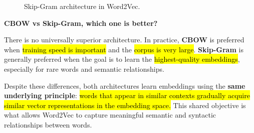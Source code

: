 \begin{figure}[!htp]
    \caption{Skip-Gram architecture in Word2Vec.\cite{mikolov2013efficient}}
    \label{fig:skipgram-architecture}
\end{figure}

\begin{flushleft}
    \textcolor{DarkOrange3}{ \textbf{CBOW vs Skip-Gram, which one is better?}}
\end{flushleft}
There is no universally superior architecture. In practice, \textbf{CBOW} is preferred when \hl{training speed is important} and the \hl{corpus is very large}. \textbf{Skip-Gram} is generally preferred when the goal is to learn the \hl{highest-quality embeddings}, especially for rare words and semantic relationships.

\highspace
Despite these differences, both architectures learn embeddings using the \textbf{same underlying principle}: \hl{words that appear in similar contexts gradually acquire similar vector representations in the embedding space.} This shared objective is what allows Word2Vec to capture meaningful semantic and syntactic relationships between words.

